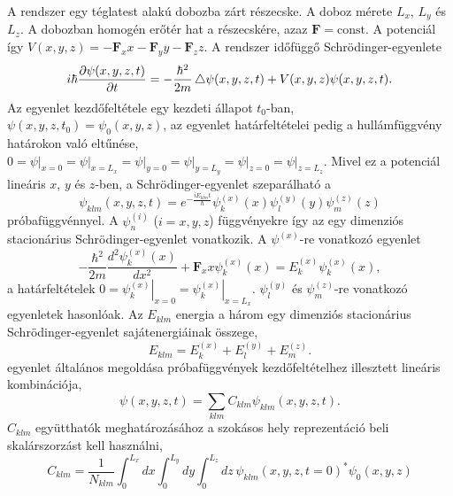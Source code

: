 A rendszer egy téglatest alakú dobozba zárt részecske. A doboz mérete $L_x$, $L_y$ és $L_z$. A dobozban homogén erőtér hat a részecskére, azaz $\boldsymbol{F} = \text{const}$. A potenciál így $V(x, y, z) = -\boldsymbol{F}_xx-\boldsymbol{F}_yy-\boldsymbol{F}_zz$. A rendszer időfüggő Schrödinger-egyenlete
\begin{equation}
	i\hbar\frac{\partial \psi(x, y, z, t)}{\partial t} = -\frac{\hbar^2}{2m} \mathop{}\!\mathbin\bigtriangleup \psi(x, y, z, t) + V(x, y, z)\psi(x, y, z, t).
	\label{3dbox:3dscheq}
\end{equation}
Az egyenlet kezdőfeltétele egy kezdeti állapot $t_0$-ban, $\psi(x, y, z, t_0) = \psi_0(x, y, z)$, az egyenlet határfeltételei pedig a hullámfüggvény határokon való eltűnése, $0=\left.\psi\right|_{x=0}=\left.\psi\right|_{x=L_x}=\left.\psi\right|_{y=0}=\left.\psi\right|_{y=L_y}=\left.\psi\right|_{z=0}=\left.\psi\right|_{z=L_z}$. Mivel ez a potenciál lineáris $x$, $y$ és $z$-ben, a Schrödinger-egyenlet szeparálható a
\begin{equation}
	\psi_{klm}(x, y, z, t) = e^{-\frac{iE_{klm}t}{\hbar}}\psi^{(x)}_k(x)\psi^{(y)}_l(y)\psi^{(z)}_m(z)
	\label{3dox:3dansatz}
\end{equation}
próbafüggvénnyel. A $\psi^{(i)}_n$ ($i=x, y, z$) függvényekre így az egy dimenziós stacionárius Schrödinger-egyenlet vonatkozik. A $\psi^{(x)}$-re vonatkozó egyenlet 
\begin{equation}
	-\frac{\hbar^2}{2m}\frac{d^2\psi^{(x)}_k(x)}{dx^2} + \boldsymbol{F}_xx\psi^{(x)}_k(x) = E^{(x)}_k\psi^{(x)}_k(x),
\end{equation}
a határfeltételek $0=\left.\psi^{(x)}_k\right|_{x=0}=\left.\psi^{(x)}_k\right|_{x=L_x}$. $\psi^{(y)}_l$ és $\psi^{(z)}_m$-re vonatkozó egyenletek hasonlóak. Az $E_{klm}$ energia a három egy dimenziós stacionárius Schrödinger-egyenlet sajátenergiáinak összege,
\begin{equation}
	E_{klm} = E^{(x)}_k+E^{(y)}_l+E^{(z)}_m.
\end{equation}
 egyenlet általános megoldása  próbafüggvények kezdőfeltételhez illesztett lineáris kombinációja,
\begin{equation}
	\psi(x,y,z,t) = \sum_{klm}C_{klm}\psi_{klm}(x,y,z,t).
\end{equation}
$C_{klm}$ együtthatók meghatározásához a szokásos hely reprezentáció beli skalárszorzást kell használni,
\begin{equation}
	C_{klm} = \frac{1}{N_{klm}}\int_0^{L_x}dx\int_0^{L_y}dy\int_0^{L_z}dz\,\psi_{klm}(x, y, z, t=0)^*\psi_0(x, y, z)
	\label{3dbox:ceq}
\end{equation}
